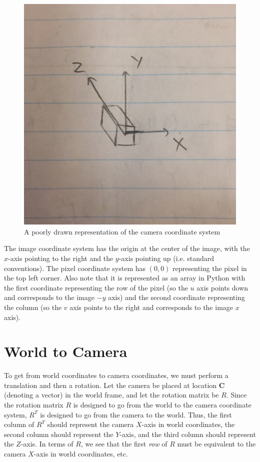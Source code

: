 \documentclass{article}
\begin{document}
\begin{figure}[H]
\includegraphics[scale=0.1]{Camera_Coordinates}
\centering
\caption{A poorly drawn representation of the camera coordinate system}
\end{figure}

The image coordinate system has the origin at the center of the image, with the $x$-axis pointing to the right and the $y$-axis pointing up (i.e. standard conventions). The pixel coordinate system has $(0, 0)$ representing the pixel in the top left corner. Also note that it is represented as an array in Python with the first coordinate representing the row of the pixel (so the $u$ axis points down and corresponds to the image $-y$ axis) and the second coordinate representing the column (so the $v$ axis points to the right and corresponds to the image $x$ axis).

\section{World to Camera}
To get from world coordinates to camera coordinates, we must perform a translation and then a rotation. Let the camera be placed at location $\bm{C}$ (denoting a vector) in the world frame, and let the rotation matrix be $R$. Since the rotation matrix $R$ is designed to go from the world to the camera coordinate system, $R^{T}$ is designed to go from the camera to the world. Thus, the first column of $R^{T}$ should represent the camera $X$-axis in world coordinates, the second column should represent the $Y$-axis, and the third column should represent the $Z$-axis. In terms of $R$, we see that the first \textit{row} of $R$ must be equivalent to the camera $X$-axis in world coordinates, etc. \\
\end{document}
